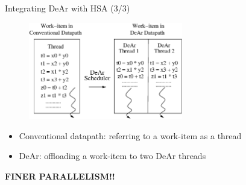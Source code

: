 \documentclass[handout]{beamer}
\begin{document}
\begin{CJK}{UTF8}{bkai}
            \begin{frame}{Integrating DeAr with HSA (3/3)}
                        \begin{figure}[!ht]
                            \centering
                                \includegraphics[width=0.6\textwidth]{figs/bb3.eps}
                        \end{figure}
                        \begin{itemize}
                            \pause
                            \item {Conventional datapath: referring to a work-item as a thread}
                            \pause
                            \item {DeAr: offloading a work-item to two DeAr threads}
                        \end{itemize}
                        \pause
                        \begin{center}
                            \large{\textbf{FINER PARALLELISM!!}}
                        \end{center}
            \end{frame}


\end{CJK}
\end{document}
